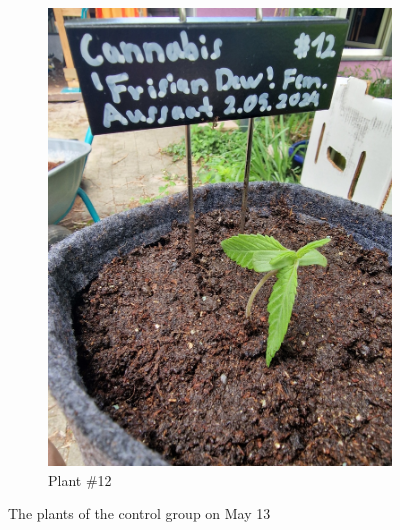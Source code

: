 \begin{figure}[H]
\begin{subfigure}[t]{.19\textwidth}
        \includegraphics[width=\linewidth]{plant_12_2024-05-13}
        \caption{Plant \#12}
        \label{fig:plant_12_2024-05-13}
    \end{subfigure}
    \caption[Plants of the control group on May 13]{The plants of the control group on May 13}
    \label{fig:plants_ctrl_2024-05-13}
\end{figure}

